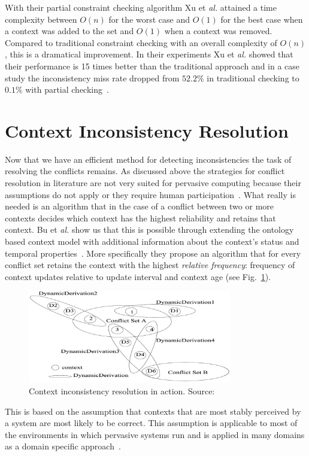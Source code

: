 \documentclass[journal]{vgtc}                %
\begin{document}
With their partial constraint checking algorithm Xu et \textit{al.} attained a time complexity between $O(n)$ for the worst case and $O(1)$ for the best case when a context was added to the set and $O(1)$ when a context was removed. Compared to traditional constraint checking with an overall complexity of $O(n)$, this is a dramatical improvement. In their experiments Xu et \textit{al.} showed that their performance is 15 times better than the traditional approach and in a case study the inconsistency miss rate dropped from $52.2\%$ in traditional checking to $0.1\%$ with partial checking~\cite{xu:2010:PCC}.

\section{Context Inconsistency Resolution}
Now that we have an efficient method for detecting inconsistencies the task of resolving the conflicts remains. As discussed above the strategies for conflict resolution in literature are not very suited for pervasive computing because their assumptions do not apply or they require human participation~\cite{xu:2010:PCC}. What really is needed is an algorithm that in the case of a conflict between two or more contexts decides which context has the highest reliability and retains that context. Bu et \textit{al.} show us that this is possible through extending the ontology based context model with additional information about the context's status and temporal properties~\cite{bu:2006:CCM}. More specifically they propose an algorithm that for every conflict set retains the context with the highest \textit{relative frequency}: frequency of context updates relative to update interval and context age (see Fig.~\ref{fig:cir}). 
\begin{figure}[htb]
  \centering
  \includegraphics[width=3.5in]{cir}
  \caption{Context inconsistency resolution in action. Source:~\cite{bu:2006:CCM}}
  \label{fig:cir}
\end{figure}
This is based on the assumption that contexts that are most stably perceived by a system are most likely to be correct. This assumption is applicable to most of the environments in which pervasive systems run and is applied in many domains as a domain specific approach~\cite{xu:2010:PCC}.
\end{document}
